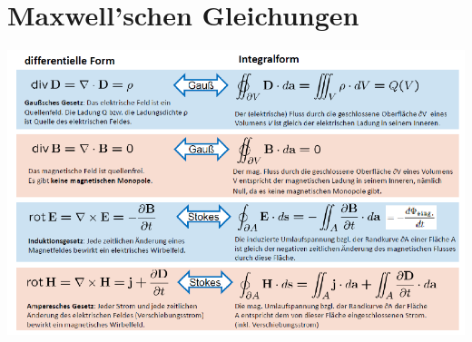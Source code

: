 \section{Maxwell’schen Gleichungen}

\includegraphics[width=\columnwidth]{Figures/Integralsatz.png}

